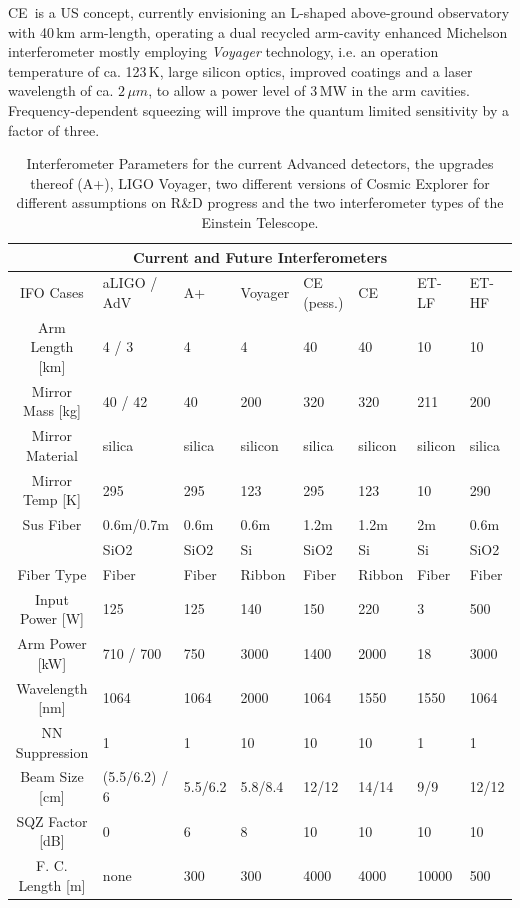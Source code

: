 \begin{tcolorbox}[standard jigsaw,colframe=antiquefuchsia!80!black,colback=antiquefuchsia!20!white,opacityback=0.6,coltext=black, title=Cosmic Explorer (CE)] 
CE\,\cite{CosmicExplorer2017} is a US concept, currently envisioning an L-shaped above-ground observatory with 40\,km arm-length, operating a dual recycled arm-cavity enhanced Michelson interferometer mostly employing \emph{Voyager} technology, i.e. an operation temperature of ca. 123\,K, large silicon optics, improved coatings and a laser wavelength of ca. $2\,\mu m$, to allow a power level of 3\,MW in the arm cavities. Frequency-dependent squeezing will improve the quantum limited sensitivity by a factor of three. \end{tcolorbox}

\begin{table}[h]
\centering
\begin{tabular}{|c|p{1.5cm}|l|l|l|l|l|l|}
\hline
 \multicolumn{8}{|c|}{Current and Future Interferometers} \\
 \hline
IFO Cases &aLIGO / AdV &A+ &Voyager &CE (pess.) &CE &ET-LF &ET-HF\\
\hline
Arm Length [km] & 4 / 3 &4& 4& 40& 40& 10 &10\\
\hline
Mirror Mass [kg]& 40 / 42& 40& 200& 320& 320& 211& 200\\
\hline
Mirror Material& silica& silica& silicon& silica& silicon& silicon& silica\\
\hline
Mirror Temp [K]& 295& 295& 123& 295& 123& 10& 290\\
\hline
Sus Fiber& 0.6m/0.7m& 0.6m& 0.6m& 1.2m& 1.2m& 2m& 0.6m\\
& SiO2& SiO2&Si&SiO2&Si&Si&SiO2\\
\hline
Fiber Type& Fiber& Fiber& Ribbon& Fiber& Ribbon& Fiber& Fiber\\
\hline
Input Power [W]& 125& 125& 140& 150& 220& 3& 500\\
\hline
Arm Power [kW]& 710 / 700& 750& 3000& 1400& 2000& 18& 3000\\
\hline
Wavelength [nm]& 1064& 1064& 2000& 1064& 1550& 1550& 1064\\
\hline
NN Suppression& 1& 1& 10& 10& 10& 1& 1\\
\hline
Beam Size [cm]& (5.5/6.2) / 6& 5.5/6.2& 5.8/8.4& 12/12& 14/14& 9/9& 12/12\\
\hline
SQZ Factor [dB]& 0& 6& 8& 10& 10& 10& 10\\
\hline
F. C. Length [m]& none& 300& 300& 4000& 4000& 10000& 500\\
\hline
\end{tabular}
\caption[FutIfos]{Interferometer Parameters for the current Advanced detectors, the upgrades thereof (A+), LIGO Voyager, two different versions of Cosmic Explorer for different assumptions on R\&D progress and the two interferometer types of the Einstein Telescope.}
\label{FutIfos}
\end{table}

